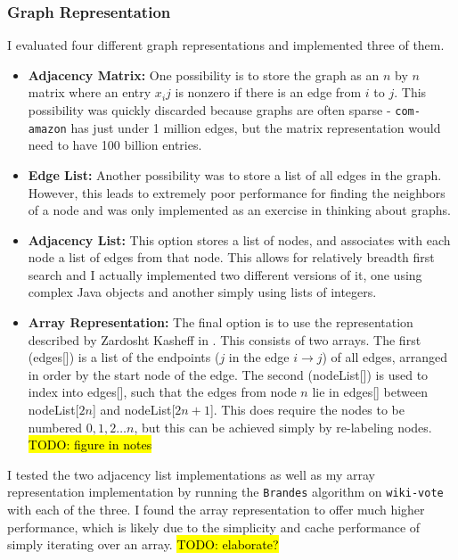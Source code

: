 \documentclass[12pt,a4paper,twoside,openright]{report}
\newcommand{\todo}[1]{\hl{TODO: #1}}
\newcommand{\ttt}[1]{\texttt{#1}}
\begin{document}
		\subsubsection{Graph Representation}
		I evaluated four different graph representations and implemented three of them.
		\begin{itemize}
			\item \textbf{Adjacency Matrix:} One possibility is to store the graph as an $n$ by $n$ matrix where an entry $x_ij$ is nonzero if there is an edge from $i$ to $j$. This possibility was quickly discarded because graphs are often sparse - \ttt{com-amazon} has just under 1 million edges, but the matrix representation would need to have 100 billion entries.
			
			\item \textbf{Edge List:} Another possibility was to store a list of all edges in the graph. However, this leads to extremely poor performance for finding the neighbors of a node and was only implemented as an exercise in thinking about graphs.
			
			\item \textbf{Adjacency List:} This option stores a list of nodes, and associates with each node a list of edges from that node. This allows for relatively breadth first search and I actually implemented two different versions of it, one using complex Java objects and another simply using lists of integers.
			
			\item \textbf{Array Representation:} The final option is to use the representation described by Zardosht Kasheff in \cite{metisparallel}. This consists of two arrays. The first (edges[]) is a list of the endpoints ($j$ in the edge $i\rightarrow j$) of all edges, arranged in order by the start node of the edge. The second (nodeList[]) is used to index into edges[], such that the edges from node $n$ lie in edges[] between nodeList[$2n$] and nodeList[$2n+1$]. This does require the nodes to be numbered $0,1,2 \dots n$, but this can be achieved simply by re-labeling nodes. 
			\todo{figure in notes}
		\end{itemize}
		I tested the two adjacency list implementations as well as my array representation implementation by running the \ttt{Brandes} algorithm on \ttt{wiki-vote} with each of the three. I found the array representation to offer much higher performance, which is likely due to the simplicity and cache performance of simply iterating over an array. \todo{elaborate?}
		
\end{document}
